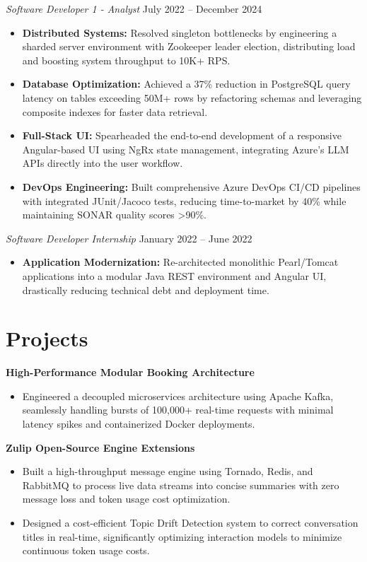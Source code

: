 \documentclass[11pt,a4paper]{article}
\begin{document}
\vspace{3pt}
\noindent
\textit{Software Developer 1 - Analyst} \hfill July 2022 -- December 2024
\begin{itemize}[leftmargin=*,noitemsep,topsep=0pt]
    \item \textbf{Distributed Systems:} Resolved singleton bottlenecks by engineering a sharded server environment with Zookeeper leader election, distributing load and boosting system throughput to 10K+ RPS.
    \item \textbf{Database Optimization:} Achieved a 37\% reduction in PostgreSQL query latency on tables exceeding 50M+ rows by refactoring schemas and leveraging composite indexes for faster data retrieval.
    \item \textbf{Full-Stack UI:} Spearheaded the end-to-end development of a responsive Angular-based UI using NgRx state management, integrating Azure's LLM APIs directly into the user workflow.
    \item \textbf{DevOps Engineering:} Built comprehensive Azure DevOps CI/CD pipelines with integrated JUnit/Jacoco tests, reducing time-to-market by 40\% while maintaining SONAR quality scores >90\%.
\end{itemize}

\vspace{3pt}
\noindent
\textit{Software Developer Internship} \hfill January 2022 -- June 2022
\begin{itemize}[leftmargin=*,noitemsep,topsep=0pt]
    \item \textbf{Application Modernization:} Re-architected monolithic Pearl/Tomcat applications into a modular Java REST environment and Angular UI, drastically reducing technical debt and deployment time.
\end{itemize}

\vspace{-5pt}
\section{Projects}
\noindent
\textbf{High-Performance Modular Booking Architecture}
\begin{itemize}[leftmargin=*,noitemsep,topsep=0pt]
    \item Engineered a decoupled microservices architecture using Apache Kafka, seamlessly handling bursts of 100,000+ real-time requests with minimal latency spikes and containerized Docker deployments.
\end{itemize}

\vspace{3pt}
\noindent
\textbf{Zulip Open-Source Engine Extensions}
\begin{itemize}[leftmargin=*,noitemsep,topsep=0pt]
    \item Built a high-throughput message engine using Tornado, Redis, and RabbitMQ to process live data streams into concise summaries with zero message loss and token usage cost optimization.
    \item Designed a cost-efficient Topic Drift Detection system to correct conversation titles in real-time, significantly optimizing interaction models to minimize continuous token usage costs.
\end{itemize}
\end{document}
